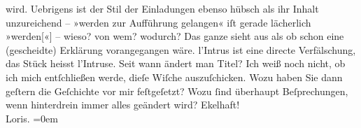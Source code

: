 \begin{ledgroupsized}[t]{13cm}
                    wird. Uebrigens ist der Stil der Einladungen ebenso hübsch als ihr Inhalt
                    unzureichend – »werden zur Aufführung gelangen« iſt gerade lächerlich »werden{[}«{]}
                    – wieso? von wem? wodurch?\pend
           \pstart
           Das ganze sieht aus als ob schon eine (gescheidte)
                    Erklärung vorangegangen wäre. l’Intrus ist
                    eine directe Verfälschung, das Stück heisst l’Intruse. {\pb}Seit
                    wann ändert man Titel?\pend
           \pstart
           Ich weiß noch nicht, ob ich mich entſchließen werde, dieſe Wiſche auszuſchicken.
                    Wozu haben Sie dann geſtern die Geſchichte vor mir feſtgeſetzt? Wozu ſind
                    überhaupt Beſprechungen, wenn hinterdrein immer alles geändert wird?\pend
           \pstart
           Ekelhaft!{\\[\baselineskip]}\spacefill\mbox{Loris.}\pend
           \leftskip=0em{}\endnumbering{}\end{ledgroupsized}  \newcommand{\dateiname}{L00092}\newcommand{\titel}{Hugo von Hofmannsthal an Arthur Schnitzler, [4. 4. 1892?]}\newcommand{\editorInnen}{Martin Anton Müller und Gerd-Hermann Susen}
            \footnotesize
\begin{ledgroupsized}[t]{11.5cm}
\end{ledgroupsized}
         
      